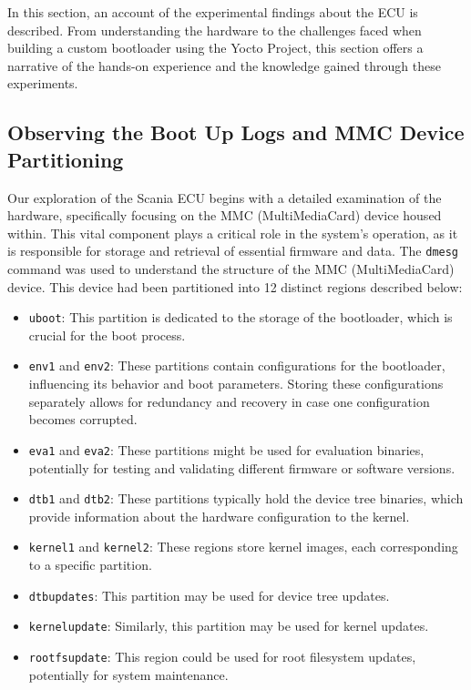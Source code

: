 In this section, an account of the experimental findings about the ECU is described. From understanding the hardware to the challenges faced when building a custom bootloader using the Yocto Project, this section offers a narrative of the hands-on experience and the knowledge gained through these experiments.

\subsection{Observing the Boot Up Logs and MMC Device Partitioning}

Our exploration of the Scania ECU begins with a detailed examination of the hardware, specifically focusing on the MMC (MultiMediaCard) device housed within. This vital component plays a critical role in the system's operation, as it is responsible for storage and retrieval of essential firmware and data. The \texttt{dmesg} command was used to understand the structure of the MMC (MultiMediaCard) device. This device had been partitioned into 12 distinct regions described below:

\begin{itemize}
	\item \texttt{uboot}: This partition is dedicated to the storage of the bootloader, which is crucial for the boot process.
	\item \texttt{env1} and \texttt{env2}: These partitions contain configurations for the bootloader, influencing its behavior and boot parameters. Storing these configurations separately allows for redundancy and recovery in case one configuration becomes corrupted.
	\item \texttt{eva1} and \texttt{eva2}: These partitions might be used for evaluation binaries, potentially for testing and validating different firmware or software versions.
	\item \texttt{dtb1} and \texttt{dtb2}: These partitions typically hold the device tree binaries, which provide information about the hardware configuration to the kernel.
	\item \texttt{kernel1} and \texttt{kernel2}: These regions store kernel images, each corresponding to a specific partition.
	\item \texttt{dtbupdates}: This partition may be used for device tree updates.
	\item \texttt{kernelupdate}: Similarly, this partition may be used for kernel updates.
	\item \texttt{rootfsupdate}: This region could be used for root filesystem updates, potentially for system maintenance.
\end{itemize}

